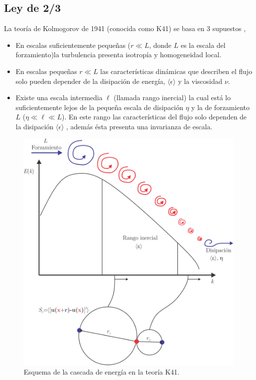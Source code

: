 \documentclass[executivepaper,12pt]{article}
\numberwithin{equation}{section}
\begin{document}
\subsection{Ley de 2/3}
La teoría de Kolmogorov de 1941 (conocida como K41) se basa en 3 supuestos \parencite{kolmogorov1941a},
\begin{itemize}
	\item En escalas suficientemente pequeñas ($r \ll L$, donde $L$ es la escala del forzamiento)la turbulencia presenta isotropía y homogeneidad local.
	\item En escalas pequeñas $r\ll L$ las características dinámicas que describen el flujo solo pueden depender de la disipación de energía, $\langle \epsilon\rangle$ y la viscosidad $\nu$.
	\item Existe una escala intermedia $\ell$ (llamada rango inercial) la cual está lo suficientemente lejos de la pequeña escala de disipación $\eta$ y la de forzamiento $L$ ($\eta \ll \ell\ll L $). En este rango las características del flujo solo dependen de la disipación $\langle \epsilon\rangle$ , además ésta presenta una invarianza de escala.
\end{itemize}


\begin{figure}[H]
	\begin{center}
		\includegraphics[scale=0.9]{k41}
	\end{center}
	\caption{Esquema de la cascada de energía en la teoría K41. }
	\label{fig-k41}
\end{figure}
\end{document}
